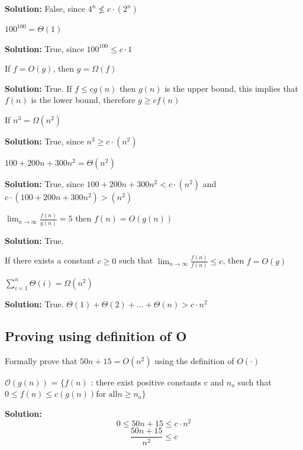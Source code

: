 \documentclass[11pt,fleqn]{book}
\begin{document}
\textbf{Solution:} False, since $4^n \not\leq c\cdot(2^n)$
\begin{example}
$100^{100} = \Theta(1)$
\end{example}
\textbf{Solution:} True, since $100^{100} \leq c \cdot 1$
\begin{example}
If $f = O(g)$, then $g = \Omega(f)$
\end{example}
\textbf{Solution:} True. If $f \leq c g(n)$ then $g(n)$ is the upper bound, this implies that $f(n)$ 
is the lower bound, therefore $g \geq c f(n)$
\begin{example}
If $n^3 = \Omega(n^2)$
\end{example}
\textbf{Solution:} True, since $n^3 \geq c \cdot(n^2)$
\begin{example}
$100 + 200n + 300n^2 = \Theta(n^2)$
\end{example}
\textbf{Solution:} True, since $100 + 200n + 300n^2 < c\cdot(n^2)$ and $c\cdot(100 + 200n + 300n^2) > (n^2)$
\begin{example}
$\lim_{n \to \infty} \frac{f(n)}{g(n)} = 5$ then $f(n) = O(g(n))$
\end{example}
\textbf{Solution:} True. 
\begin{definition}
If there exists a constant $c \geq 0$ such that $\lim_{n \to \infty} \frac{f(n)}{f(n)} \leq c$, then $f = O(g)$
\end{definition}
\begin{example}
$\sum_{i=1}^n \Theta(i) = \Omega(n^2)$
\end{example}
\textbf{Solution:} True. $\Theta(1) + \Theta(2) + \dots + \Theta(n) > c \cdot n^2$
\subsection{Proving using definition of O}
\vspace{1em}
\begin{example}
Formally prove that $50n + 15 = O(n^2)$ using the definition of $O(\cdot)$
\end{example}
\begin{definition}
$\mathcal{O}(g(n))$ = $\{f(n)$ : there exist positive constants c and  $n_o$ such that\\ $
    0 \leq f(n) \leq c(g(n)) \text{for all} n \geq n_o\}$
\end{definition}
\textbf{Solution:} $$0 \leq 50n + 15 \leq c\cdot n^2$$
$$\frac{50n + 15}{n^2} \leq c$$
\end{document}
